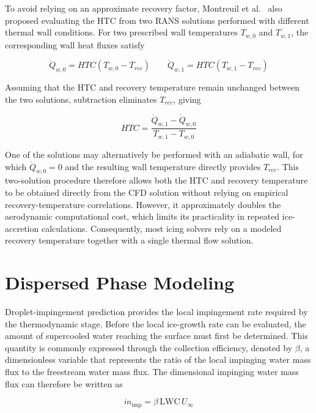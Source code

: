 To avoid relying on an approximate recovery factor, Montreuil et al.~\cite{montreuilHTC} also proposed evaluating the HTC from two RANS solutions performed with different thermal wall conditions. For two prescribed wall temperatures $T_{w,0}$ and $T_{w,1}$, the corresponding wall heat fluxes satisfy

\begin{equation}
    \dot{Q}_{w,0}
    =
    HTC\left(T_{w,0}-T_{rec}\right)
    \qquad
    \dot{Q}_{w,1}
    =
    HTC\left(T_{w,1}-T_{rec}\right)
\end{equation}

Assuming that the HTC and recovery temperature remain unchanged between the two solutions, subtraction eliminates $T_{rec}$, giving

\begin{equation}
    HTC
    =
    \frac{\dot{Q}_{w,1}-\dot{Q}_{w,0}}
         {T_{w,1}-T_{w,0}}
    \label{eq:htc_two_solutions}
\end{equation}

One of the solutions may alternatively be performed with an adiabatic wall, for which $\dot{Q}_{w,0}=0$ and the resulting wall temperature directly provides $T_{rec}$. This two-solution procedure therefore allows both the HTC and recovery temperature to be obtained directly from the CFD solution without relying on empirical recovery-temperature correlations. However, it approximately doubles the aerodynamic computational cost, which limits its practicality in repeated ice-accretion calculations. Consequently, most icing solvers rely on a modeled recovery temperature together with a single thermal flow solution.

\section{Dispersed Phase Modeling}\label{sec:review_droplet_impingement}

Droplet-impingement prediction provides the local impingement rate required by the thermodynamic stage. Before the local ice-growth rate can be evaluated, the amount of supercooled water reaching the surface must first be determined. This quantity is commonly expressed through the collection efficiency, denoted by $\beta$, a dimensionless variable that represents the ratio of the local impinging water mass flux to the freestream water mass flux. The dimensional impinging water mass flux can therefore be written as

\begin{equation}
    \dot{m}_{\mathrm{imp}} = \beta \, \mathrm{LWC} \, U_\infty
    \label{eq:impinging_mass_flux}
\end{equation}


